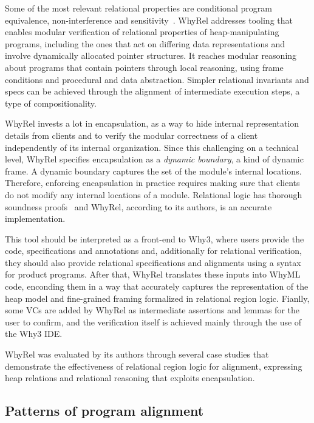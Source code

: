 Some of the most relevant relational properties are conditional program equivalence, non-interference and sensitivity~\cite{barthe2019verifying}.
WhyRel addresses tooling that enables modular verification of relational properties of heap-manipulating programs, including the ones that act on differing data representations and involve dynamically allocated pointer structures.
It reaches modular reasoning about programs that contain pointers through local reasoning, using frame conditions and procedural and data abstraction.
Simpler relational invariants and specs can be achieved through the alignment of intermediate execution steps, a type of compositionality.

WhyRel invests a lot in encapsulation, as a way to hide internal representation details from clients and to verify the modular correctness of a client independently of its internal organization.
Since this challenging on a technical level, WhyRel specifies encapsulation as a \emph{dynamic boundary}, a kind of dynamic frame.
A dynamic boundary captures the set of the module's internal locations.
Therefore, enforcing encapsulation in practice requires making sure that clients do not modify any internal locations of a module.
Relational logic has thorough soundness proofs~\cite{10.1145/3551497} and WhyRel, according to its authors, is an accurate implementation.

This tool should be interpreted as a front-end to Why3, where users provide the code, specifications and annotations and, additionally for relational verification, they should also provide relational specifications and alignments using a syntax for product programs.
After that, WhyRel translates these inputs into WhyML code, enconding them in a way that accurately captures the representation of the heap model and fine-grained framing formalized in relational region logic.
Fianlly, some VCs are added by WhyRel as intermediate assertions and lemmas for the user to confirm, and the verification itself is achieved mainly through the use of the Why3 IDE.

WhyRel was evaluated by its authors through several case studies that demonstrate the effectiveness of relational region logic for alignment, expressing heap relations and relational reasoning that exploits encapsulation.


\subsection{Patterns of program alignment}
\label{subsec:whyrel_patterns}

